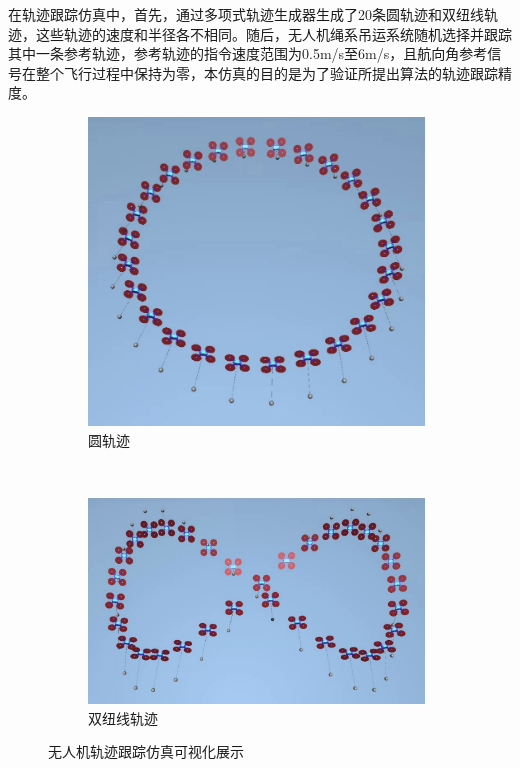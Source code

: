\documentclass[lang=chs, degree=master, blindreview=true, winfonts=true]{yanputhesis}
\begin{document}
在轨迹跟踪仿真中，首先，通过多项式轨迹生成器生成了20条圆轨迹和双纽线轨迹，这些轨迹的速度和半径各不相同。随后，无人机绳系吊运系统随机选择并跟踪其中一条参考轨迹，参考轨迹的指令速度范围为0.5m/s至6m/s，且航向角参考信号在整个飞行过程中保持为零，本仿真的目的是为了验证所提出算法的轨迹跟踪精度。
\begin{figure}[hbt!]
	\centering
	\begin{subfigure}[t]{0.9\textwidth}
		\centering
		\includegraphics[width=0.98\textwidth]{picture/kk/yuan.jpg}
		\vspace{-0.2cm}
		\caption{圆轨迹}
		\label{yuana}
	\end{subfigure}\\[1.2ex] %
	\begin{subfigure}[t]{0.9\textwidth}
		\centering
		\includegraphics[width=0.98\textwidth]{picture/kk/bazi.jpg}
		\vspace{-0.2cm}
		\caption{双纽线轨迹}
		\label{bazib}
	\end{subfigure}
	\caption{无人机轨迹跟踪仿真可视化展示}
	\label{mujoco}
\end{figure}
\end{document}
